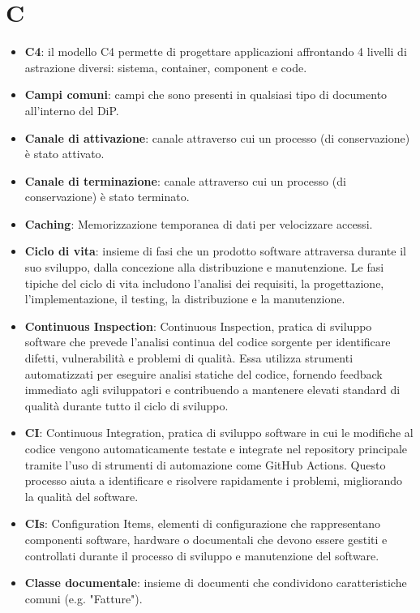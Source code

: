\documentclass[a4paper,12pt]{article}
\begin{document}
\section{C}
\begin{itemize}
    \item \textbf{C4}: il modello C4 permette di progettare applicazioni affrontando 4 livelli di astrazione diversi: sistema, container, component e code. 
    \item \textbf{Campi comuni}: campi che sono presenti in qualsiasi tipo di documento all'interno del DiP.
    \item \textbf{Canale di attivazione}: canale attraverso cui un processo (di conservazione) è stato attivato.
    \item \textbf{Canale di terminazione}: canale attraverso cui un processo (di conservazione) è stato terminato.
    \item \textbf{Caching}: Memorizzazione temporanea di dati per velocizzare accessi.
    \item \textbf{Ciclo di vita}: insieme di fasi che un prodotto software attraversa durante il suo sviluppo, dalla concezione alla distribuzione e manutenzione. Le fasi tipiche del ciclo di vita includono l'analisi dei requisiti, la progettazione, l'implementazione, il testing, la distribuzione e la manutenzione.
    \item \textbf{Continuous Inspection}: Continuous Inspection, pratica di sviluppo software che prevede l'analisi continua del codice sorgente per identificare difetti, vulnerabilità e problemi di qualità. Essa utilizza strumenti automatizzati per eseguire analisi statiche del codice, fornendo feedback immediato agli sviluppatori e contribuendo a mantenere elevati standard di qualità durante tutto il ciclo di sviluppo.
    \item \textbf{CI}: Continuous Integration, pratica di sviluppo software in cui le modifiche al codice vengono automaticamente testate e integrate nel repository principale tramite l'uso di strumenti di automazione come GitHub Actions. Questo processo aiuta a identificare e risolvere rapidamente i problemi, migliorando la qualità del software.
    \item \textbf{CIs}: Configuration Items, elementi di configurazione che rappresentano componenti software, hardware o documentali che devono essere gestiti e controllati durante il processo di sviluppo e manutenzione del software.
    \item \textbf{Classe documentale}: insieme di documenti che condividono caratteristiche comuni (e.g. "Fatture").

\end{itemize}
\end{document}
